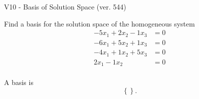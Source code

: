 \begin{exercise}
  \begin{exerciseTitle}V10 - Basis of Solution Space (ver. 544)\end{exerciseTitle}
  \begin{exerciseStatement}
    Find a basis for the solution space of the homogeneous system 
\begin{align*}
 -5 x_ 1 + 2 x_ 2 -1 x_ 3 &= 0  \\ 
  -6 x_ 1 + 5 x_ 2 + 1 x_ 3 &= 0  \\ 
  -4 x_ 1 + 1 x_ 2 + 5 x_ 3 &= 0  \\ 
  2 x_ 1 -1 x_ 2 &= 0  \\ 
 \end{align*}


 
  \end{exerciseStatement}

  \begin{exerciseAnswer}
   A basis is   
\[\left\{\right\}.\]

  


  \end{exerciseAnswer}
\end{exercise}